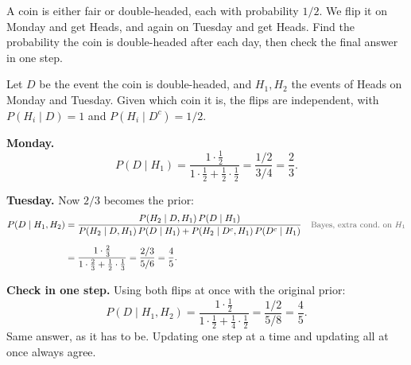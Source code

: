 \begin{example}\label{ex:sequential}
A coin is either fair or double-headed, each with probability $1/2$. We flip it on Monday and get Heads, and again on Tuesday and get Heads. Find the probability the coin is double-headed after each day, then check the final answer in one step.
\end{example}
\begin{solution}
Let $D$ be the event the coin is double-headed, and $H_1, H_2$ the events of Heads on Monday and Tuesday. Given which coin it is, the flips are independent, with $P(H_i \mid D) = 1$ and $P(H_i \mid D^c) = 1/2$.

\textbf{Monday.}
\[
P(D \mid H_1)
  = \frac{1 \cdot \frac{1}{2}}{1 \cdot \frac{1}{2} + \frac{1}{2} \cdot \frac{1}{2}}
  = \frac{1/2}{3/4}
  = \frac{2}{3}.
\]

\textbf{Tuesday.} Now $2/3$ becomes the prior:
\begin{align*}
P(D \mid H_1, H_2)
  &= \frac{P(H_2 \mid D, H_1)\,P(D \mid H_1)}{P(H_2 \mid D, H_1)\,P(D \mid H_1) + P(H_2 \mid D^c, H_1)\,P(D^c \mid H_1)}
  && \by{Bayes, extra cond.\ on $H_1$} \\[0.6em]
  &= \frac{1 \cdot \frac{2}{3}}{1 \cdot \frac{2}{3} + \frac{1}{2} \cdot \frac{1}{3}}
   = \frac{2/3}{5/6}
   = \frac{4}{5}.
\end{align*}

\textbf{Check in one step.} Using both flips at once with the original prior:
\[
P(D \mid H_1, H_2)
  = \frac{1 \cdot \frac{1}{2}}{1 \cdot \frac{1}{2} + \frac{1}{4} \cdot \frac{1}{2}}
  = \frac{1/2}{5/8}
  = \frac{4}{5}.
\]
Same answer, as it has to be. Updating one step at a time and updating all at once always agree.
\end{solution}